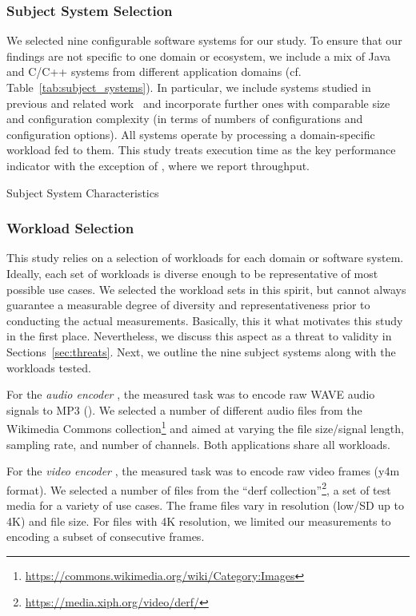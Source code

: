 {\subsubsection{Subject System Selection}
{\color{black}
We selected nine configurable software systems for our study. To ensure that our findings are not specific to one domain or ecosystem, we include a mix of Java and C/C++ systems from different application domains (cf. Table~\ref{tab:subject_systems}). In particular, we include systems studied in previous and related work~\cite{velez_2020_configcrusher_jase,weber_white_2021,alves_sampling_2020} and incorporate further ones with comparable size and configuration complexity (in terms of numbers of configurations and configuration options). All systems operate by processing a domain-specific workload fed to them. This study treats execution time as the key performance indicator with the exception of \htwo, where we report throughput.

\begin{table}
	\footnotesize
	\centering
	\caption{Subject System Characteristics}
	
	\label{tab:subject_systems}
\end{table}

\subsubsection{Workload Selection}
This study relies on a selection of workloads for each domain or software system. Ideally, each set of workloads is diverse enough to be representative of most possible use cases. We selected the workload sets in this spirit, but cannot always guarantee a measurable degree of diversity and representativeness prior to conducting the actual measurements. Basically, this it what motivates this study in the first place. Nevertheless, we discuss this aspect as a threat to validity in Sections~\ref{sec:threats}. Next, we outline the nine subject systems along with the workloads tested. 

For the \textit{audio encoder} \jumper, the measured task was to encode raw WAVE audio signals to MP3 (\jumper). We selected a number of different audio files from the Wikimedia Commons collection\footnote{\url{https://commons.wikimedia.org/wiki/Category:Images}} and aimed at varying the file size/signal length, sampling rate, and number of channels. Both applications share all workloads.

For the \textit{video encoder} \xzwo, the measured task was to encode raw video frames (y4m format). We selected a number of files from the “derf collection”\footnote{\url{https://media.xiph.org/video/derf/}}, a set of test media for a variety of use cases. The frame files vary in resolution (low/SD up to 4K) and file size. For files with 4K resolution, we limited our measurements to encoding a subset of consecutive frames.

}}
